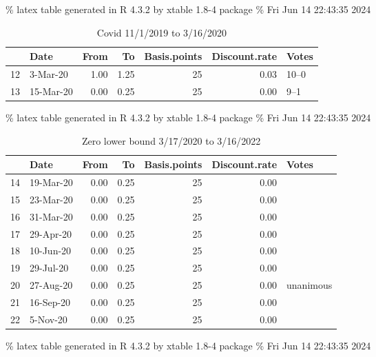 \documentclass[
]{article}
\begin{document}
\% latex table generated in R 4.3.2 by xtable 1.8-4 package
\% Fri Jun 14 22:43:35 2024

\begin{table}[ht]
\centering
\begin{tabular}{rlrrrrl}
  \hline
 & Date & From & To & Basis.points & Discount.rate & Votes \\ 
  \hline
12 & 3-Mar-20 & 1.00 & 1.25 &  25 & 0.03 & 10–0 \\ 
  13 & 15-Mar-20 & 0.00 & 0.25 &  25 & 0.00 & 9–1 \\ 
   \hline
\end{tabular}
\caption{Covid 11/1/2019 to 3/16/2020} 
\label{tab:fomccovid}
\end{table}

\% latex table generated in R 4.3.2 by xtable 1.8-4 package
\% Fri Jun 14 22:43:35 2024

\begin{table}[ht]
\centering
\begin{tabular}{rlrrrrl}
  \hline
 & Date & From & To & Basis.points & Discount.rate & Votes \\ 
  \hline
14 & 19-Mar-20 & 0.00 & 0.25 &  25 & 0.00 &  \\ 
  15 & 23-Mar-20 & 0.00 & 0.25 &  25 & 0.00 &   \\ 
  16 & 31-Mar-20 & 0.00 & 0.25 &  25 & 0.00 &  \\ 
  17 & 29-Apr-20 & 0.00 & 0.25 &  25 & 0.00 &   \\ 
  18 & 10-Jun-20 & 0.00 & 0.25 &  25 & 0.00 &   \\ 
  19 & 29-Jul-20 & 0.00 & 0.25 &  25 & 0.00 &   \\ 
  20 & 27-Aug-20 & 0.00 & 0.25 &  25 & 0.00 & unanimous \\ 
  21 & 16-Sep-20 & 0.00 & 0.25 &  25 & 0.00 &   \\ 
  22 & 5-Nov-20 & 0.00 & 0.25 &  25 & 0.00 &   \\ 
   \hline
\end{tabular}
\caption{Zero lower bound 3/17/2020 to 3/16/2022} 
\label{tab:fomczlb}
\end{table}

\% latex table generated in R 4.3.2 by xtable 1.8-4 package
\% Fri Jun 14 22:43:35 2024
\end{document}
